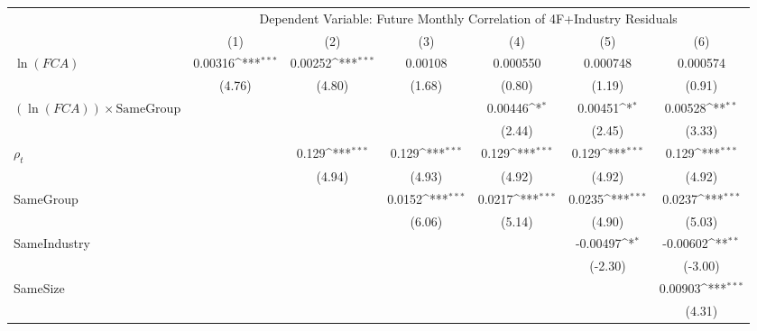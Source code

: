 {
\def\sym#1{\ifmmode^{#1}\else\(^{#1}\)\fi}
\begin{tabular}{l*{6}{c}}
\hline\hline
                &\multicolumn{6}{c}{Dependent Variable: Future Monthly Correlation of 4F+Industry Residuals}                      \\\cmidrule(lr){2-7}
                &\multicolumn{1}{c}{(1)}         &\multicolumn{1}{c}{(2)}         &\multicolumn{1}{c}{(3)}         &\multicolumn{1}{c}{(4)}         &\multicolumn{1}{c}{(5)}         &\multicolumn{1}{c}{(6)}         \\
\hline
$\ln(FCA)$      &  0.00316\sym{***}&  0.00252\sym{***}&  0.00108         & 0.000550         & 0.000748         & 0.000574         \\
                &   (4.76)         &   (4.80)         &   (1.68)         &   (0.80)         &   (1.19)         &   (0.91)         \\
[1em]
$ (\ln(FCA)) \times {\text{SameGroup} }  $ &                  &                  &                  &  0.00446\sym{*}  &  0.00451\sym{*}  &  0.00528\sym{**} \\
                &                  &                  &                  &   (2.44)         &   (2.45)         &   (3.33)         \\
[1em]
 $ {\rho_t} $   &                  &    0.129\sym{***}&    0.129\sym{***}&    0.129\sym{***}&    0.129\sym{***}&    0.129\sym{***}\\
                &                  &   (4.94)         &   (4.93)         &   (4.92)         &   (4.92)         &   (4.92)         \\
[1em]
SameGroup       &                  &                  &   0.0152\sym{***}&   0.0217\sym{***}&   0.0235\sym{***}&   0.0237\sym{***}\\
                &                  &                  &   (6.06)         &   (5.14)         &   (4.90)         &   (5.03)         \\
[1em]
SameIndustry    &                  &                  &                  &                  & -0.00497\sym{*}  & -0.00602\sym{**} \\
                &                  &                  &                  &                  &  (-2.30)         &  (-3.00)         \\
[1em]
SameSize        &                  &                  &                  &                  &                  &  0.00903\sym{***}\\
                &                  &                  &                  &                  &                  &   (4.31)         \\

\end{tabular}}
